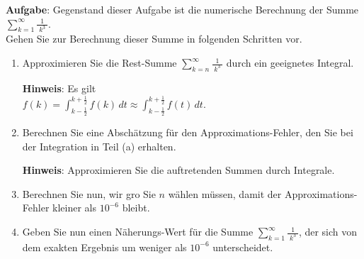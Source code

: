 \documentclass{article}
\newcommand{\bruch}[2]{\displaystyle\frac{\;\displaystyle#1\;}{\;\displaystyle#2\;}}
\begin{document}
\noindent
\textbf{Aufgabe}: Gegenstand dieser Aufgabe ist die numerische Berechnung der Summe 
\\[0.1cm]
\hspace*{1.3cm} $\displaystyle \sum\limits_{k=1}^\infty \bruch{1}{k^3}$.
\\[0.1cm]
Gehen Sie zur Berechnung dieser Summe in folgenden Schritten vor.
\begin{enumerate}
\item Approximieren Sie die Rest-Summe $\sum\limits_{k=n}^\infty \bruch{1}{k^3}$ 
      durch ein geeignetes Integral.

      \textbf{Hinweis}: Es gilt 
      \\[0.1cm]
      \hspace*{1.3cm} $\displaystyle f(k) = \int_{k-\frac{1}{2}}^{k+\frac{1}{2}} f(k) \, dt \approx \int_{k-\frac{1}{2}}^{k+\frac{1}{2}} f(t) \, dt$.
\item Berechnen Sie eine Absch\"atzung f\"ur den Approximations-Fehler,
      den Sie bei der Integration in Teil (a) erhalten.
      
      \textbf{Hinweis}: Approximieren Sie die auftretenden Summen durch Integrale.
\item Berechnen Sie nun, wir gro\3 Sie $n$ w\"ahlen m\"ussen, damit der Approximations-Fehler
      kleiner als $10^{-6}$ bleibt.
\item Geben Sie nun einen N\"aherungs-Wert f\"ur die Summe $\sum\limits_{k=1}^\infty \bruch{1}{k^3}$,
      der sich von dem exakten Ergebnis um weniger als $10^{-6}$ unterscheidet.
\end{enumerate}
\vspace*{0.3cm} 
\end{document}
